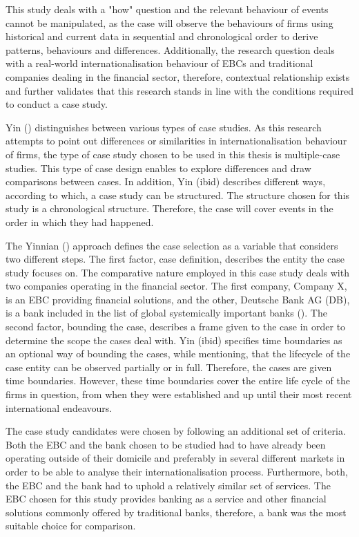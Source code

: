\documentclass[11pt,a4paper]{article}
\begin{document}
{{This study deals with a "how" question and the relevant behaviour of events cannot be manipulated, as the case will observe the behaviours of firms using historical and current data in sequential and chronological order to derive patterns, behaviours and differences. Additionally, the research question deals with a real-world internationalisation behaviour of EBCs and traditional companies dealing in the financial sector, therefore, contextual relationship exists and further validates that this research stands in line with the conditions required to conduct a case study. \par
Yin (\citeyear{yinCaseStudyResearch2017}) distinguishes between various types of case studies. As this research attempts to point out differences or similarities in internationalisation behaviour of firms, the type of case study chosen to be used in this thesis is multiple-case studies. This type of case design enables to explore differences and draw comparisons between cases. In addition, Yin (ibid) describes different ways, according to which, a case study can be structured. The structure chosen for this study is a chronological structure. Therefore, the case will cover events in the order in which they had happened.  \par

The Yinnian (\citeyear{yinCaseStudyResearch2017}) approach defines the case selection as a variable that considers two different steps. The first factor, case definition, describes the entity the case study focuses on. The comparative nature employed in this case study deals with two companies operating in the financial sector. The first company, Company X, is an EBC providing financial solutions, and the other, Deutsche Bank AG (DB), is a bank included in the list of global systemically important banks (\cite{2019ListGlobal2019}).  The second factor, bounding the case, describes a frame given to the case in order to determine the scope the cases deal with. Yin (ibid) specifies time boundaries as an optional way of bounding the cases, while mentioning, that the lifecycle of the case entity can be observed partially or in full. Therefore, the cases are given time boundaries. However, these time boundaries cover the entire life cycle of the firms in question, from when they were established and up until their most recent international endeavours.   \par

The case study candidates were chosen by following an additional set of criteria. Both the EBC and the bank chosen to be studied had to have already been operating outside of their domicile and preferably in several different markets in order to be able to analyse their internationalisation process.  Furthermore, both, the EBC and the bank had to uphold a relatively similar set of services. The EBC chosen for this study provides banking as a service and other financial solutions commonly offered by traditional banks, therefore, a bank was the most suitable choice for comparison. 

}}
\end{document}
